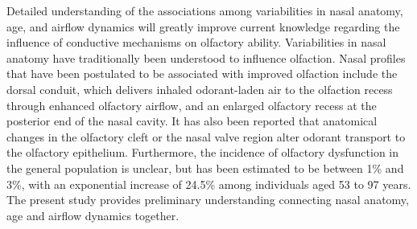 Detailed understanding of the associations among variabilities in nasal anatomy, age, and airflow dynamics will greatly improve current knowledge regarding the influence of conductive mechanisms on olfactory ability. Variabilities in nasal 
anatomy have traditionally been understood to influence olfaction\cite{Eiting2015, Craven2007}. Nasal profiles that have been postulated to be associated with improved olfaction include the dorsal conduit, which delivers inhaled odorant-laden air to the olfaction recess through enhanced olfactory airflow, and an enlarged olfactory recess at the posterior end of the nasal cavity\cite{Eiting2015, Craven2007, Eiting2014}. It has also been reported that anatomical changes in the olfactory cleft or the nasal valve region alter odorant transport to the olfactory epithelium\cite{Zhao2004a}. Furthermore, the incidence of olfactory dysfunction in the general population is unclear, but has been estimated to be between 1\% and 3\%, with an exponential increase of 24.5\% among individuals aged 53 to 97 years\cite{Landis2004, Braemerson2004, Wysocki1989, Hoffman1998, Murphy2002}. The present study provides preliminary understanding connecting nasal anatomy, age and airflow dynamics together.
